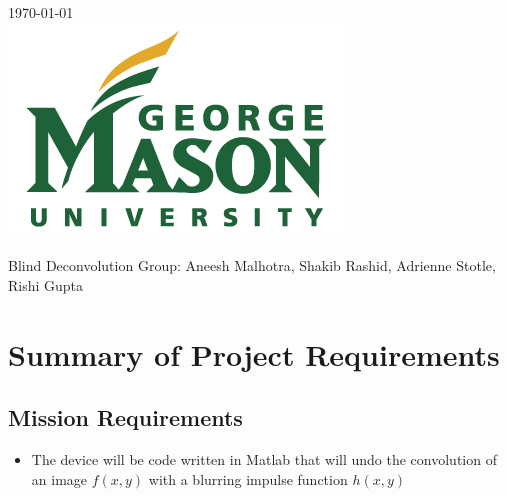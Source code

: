 \documentclass[11pt]{article}
\begin{document}
\begin{titlepage}

{\large \today}\\[2cm] %


\includegraphics{watermark2.jpg}\\[1cm] %
 

\vfill %

\end{titlepage}
\clearpage
\tableofcontents
\clearpage


Blind Deconvolution Group:
Aneesh Malhotra, Shakib Rashid, Adrienne Stotle, Rishi Gupta
\section{Summary of Project Requirements}

\subsection{Mission Requirements}

\begin{itemize}
\item The device will be code written in Matlab that will undo the convolution of an image $f(x,y)$ with a blurring impulse function $h(x,y)$

\end{itemize}
\end{document}
